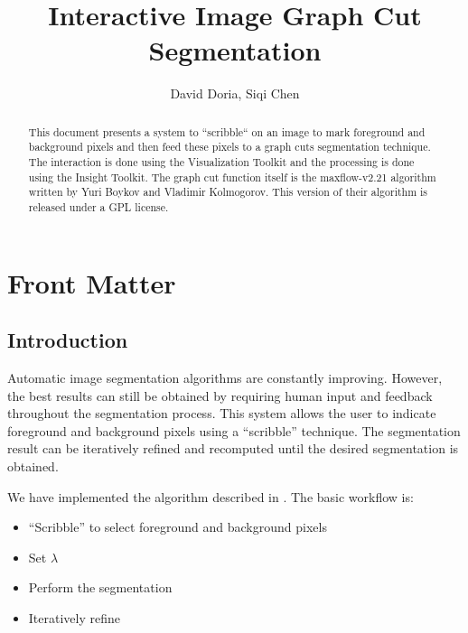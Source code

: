 \documentclass{InsightArticle}
\title{Interactive Image Graph Cut Segmentation}
\author{David Doria, Siqi Chen}
\newcommand{\IJhandlerIDnumber}{3233}
\begin{document}
\IJhandlefooter{\IJhandlerIDnumber}


\ifpdf
\else
\fi


\maketitle


\ifhtml
\chapter*{Front Matter\label{front}}
\fi

\begin{abstract}
\noindent
This document presents a system to ``scribble`` on an image to mark foreground and background pixels and then feed these pixels to a graph cuts segmentation technique. The interaction is done using the Visualization Toolkit and the processing is done using the Insight Toolkit. The graph cut function itself is the maxflow-v2.21 algorithm written by Yuri Boykov and Vladimir Kolmogorov. This version of their algorithm is released under a GPL license.

\end{abstract}

\IJhandlenote{\IJhandlerIDnumber}

\tableofcontents
\section{Introduction}
Automatic image segmentation algorithms are constantly improving. However, the best results can still be obtained by requiring human input and feedback throughout the segmentation process. This system allows the user to indicate foreground and background pixels using a ``scribble'' technique. The segmentation result can be iteratively refined and recomputed until the desired segmentation is obtained.

We have implemented the algorithm described in \cite{boykov2006}. The basic workflow is:
\begin{itemize}
\item ``Scribble'' to select foreground and background pixels
\item Set $\lambda$
\item Perform the segmentation
\item Iteratively refine
\end{itemize}
\end{document}
